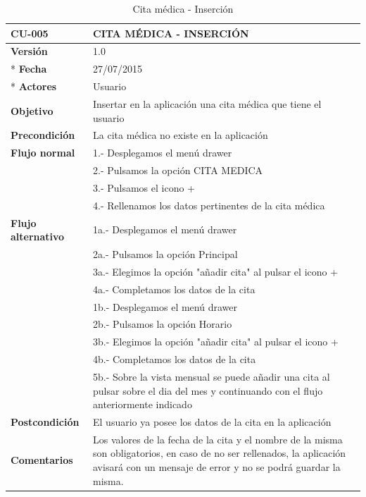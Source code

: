 \documentclass[../pfc.tex]{subfiles}
\begin{document}
	\begin{table}[H]
		\centering
		\begin{tabular}[t]{|p{3cm}|p{9.5cm}|}
			\hline \textbf{CU-005} & \textbf{CITA MÉDICA - INSERCIÓN} \\*
			\hline\hline \textbf{Versión} & 1.0 \\ *
			\hline\hline \textbf{Fecha} & 27/07/2015 \\ *
			\hline\textbf{Actores} 	& Usuario\\*
			\hline \textbf{Objetivo} & Insertar en la aplicación una cita médica que tiene el usuario\\* 			
			\hline \textbf{Precondición} & La cita médica no existe en la aplicación\\* 
			\hline \textbf{Flujo normal} & 1.- Desplegamos el menú drawer \\* 
			& 2.- Pulsamos la opción CITA MEDICA\\*	
			& 3.- Pulsamos el icono +\\*	
			& 4.- Rellenamos los datos pertinentes de la cita médica\\*	
			\hline \textbf{Flujo alternativo} & 1a.- Desplegamos el menú drawer \\* 
			& 2a.- Pulsamos la opción Principal \\*	
			& 3a.- Elegimos la opción "añadir cita" al pulsar el icono +\\*	
			& 4a.- Completamos los datos de la cita\\*	
			& 1b.- Desplegamos el menú drawer \\* 
			& 2b.- Pulsamos la opción Horario \\*	
			& 3b.- Elegimos la opción "añadir cita" al pulsar el icono +\\*	
			& 4b.- Completamos los datos de la cita\\*	
			& 5b.- Sobre la vista mensual se puede añadir una cita al pulsar sobre el dia del mes y continuando con el flujo anteriormente indicado\\*	
			\hline \textbf{Postcondición} & El usuario ya posee los datos de la cita en la aplicación \\* 
			\hline \textbf{Comentarios}   & Los valores de la fecha de la cita y el nombre de la misma son obligatorios, en caso de no ser rellenados, la aplicación avisará con un mensaje de error y no se podrá guardar la misma.\\*
			\hline
		\end{tabular}
		\caption{Cita médica - Inserción}
		\label{tabla:caso005}

	\end{table}
\end{document}
